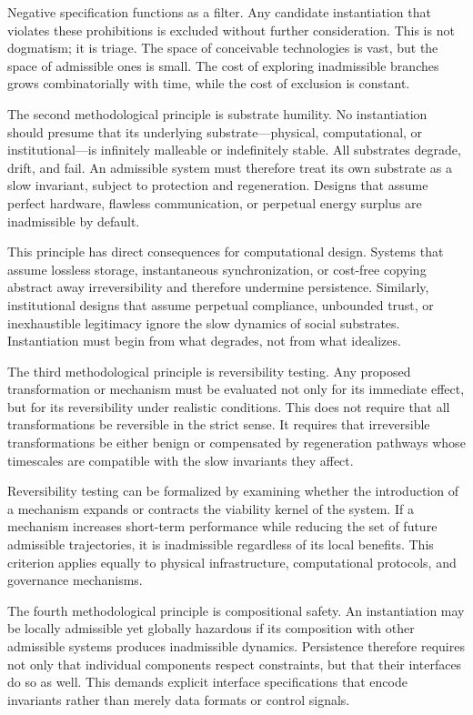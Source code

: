 \documentclass[12pt,oneside]{book}
\begin{document}
Negative specification functions as a filter. Any candidate instantiation that violates these prohibitions is excluded without further consideration. This is not dogmatism; it is triage. The space of conceivable technologies is vast, but the space of admissible ones is small. The cost of exploring inadmissible branches grows combinatorially with time, while the cost of exclusion is constant.

The second methodological principle is substrate humility. No instantiation should presume that its underlying substrate—physical, computational, or institutional—is infinitely malleable or indefinitely stable. All substrates degrade, drift, and fail. An admissible system must therefore treat its own substrate as a slow invariant, subject to protection and regeneration. Designs that assume perfect hardware, flawless communication, or perpetual energy surplus are inadmissible by default.

This principle has direct consequences for computational design. Systems that assume lossless storage, instantaneous synchronization, or cost-free copying abstract away irreversibility and therefore undermine persistence. Similarly, institutional designs that assume perpetual compliance, unbounded trust, or inexhaustible legitimacy ignore the slow dynamics of social substrates. Instantiation must begin from what degrades, not from what idealizes.

The third methodological principle is reversibility testing. Any proposed transformation or mechanism must be evaluated not only for its immediate effect, but for its reversibility under realistic conditions. This does not require that all transformations be reversible in the strict sense. It requires that irreversible transformations be either benign or compensated by regeneration pathways whose timescales are compatible with the slow invariants they affect.

Reversibility testing can be formalized by examining whether the introduction of a mechanism expands or contracts the viability kernel of the system. If a mechanism increases short-term performance while reducing the set of future admissible trajectories, it is inadmissible regardless of its local benefits. This criterion applies equally to physical infrastructure, computational protocols, and governance mechanisms.

The fourth methodological principle is compositional safety. An instantiation may be locally admissible yet globally hazardous if its composition with other admissible systems produces inadmissible dynamics. Persistence therefore requires not only that individual components respect constraints, but that their interfaces do so as well. This demands explicit interface specifications that encode invariants rather than merely data formats or control signals.
\end{document}
